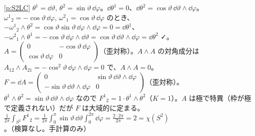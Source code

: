 \begin{sol}{\ref{p:S2LC}}
$\theta^1=\dd\vartheta$, $\theta^2=\sin\vartheta\,\dd\varphi$。$\dd\theta^1=0$、$\dd\theta^2=\cos\vartheta\,\dd\vartheta\wedge\dd\varphi$。$\omega^1{}_2=-\cos\vartheta\,\dd\varphi$, $\omega^2{}_1=\cos\vartheta\,\dd\varphi$ のとき、$-\omega^1{}_2\wedge\theta^2=\cos\vartheta\sin\vartheta\,\dd\varphi\wedge\dd\varphi=0=\dd\theta^1$、$-\omega^2{}_1\wedge\theta^1=-\cos\vartheta\,\dd\varphi\wedge\dd\vartheta=\cos\vartheta\,\dd\vartheta\wedge\dd\varphi=\dd\theta^2$ ✓。$A=\begin{pmatrix}0&-\cos\vartheta\,\dd\varphi\\\cos\vartheta\,\dd\varphi&0\end{pmatrix}$（歪対称）。$A\wedge A$ の対角成分は $A_{12}\wedge A_{21}=-\cos^2\vartheta\,\dd\varphi\wedge\dd\varphi=0$ で、$A\wedge A=0$。$F=\dd A=\begin{pmatrix}0&\sin\vartheta\,\dd\vartheta\wedge\dd\varphi\\-\sin\vartheta\,\dd\vartheta\wedge\dd\varphi&0\end{pmatrix}$（歪対称）。$\theta^1\wedge\theta^2=\sin\vartheta\,\dd\vartheta\wedge\dd\varphi$ なので $F^1{}_2=1\cdot\theta^1\wedge\theta^2$（$K=1$）。$A$ は極で特異（枠が極で定義されない）だが $F$ は大域的に定まる。$\frac1{2\pi}\int_{S^2}F^1{}_2=\frac1{2\pi}\int_0^\pi\sin\vartheta\,\dd\vartheta\int_0^{2\pi}\dd\varphi=\frac{2\cdot2\pi}{2\pi}=2=\chi(S^2)$。（検算なし。手計算のみ）
\end{sol}

